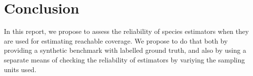 \documentclass[conference]{IEEEtran}
\begin{document}
\section{Conclusion}
\label{sec:conclusion}
In this report, we propose to assess the reliability of species estimators when
they are used for estimating reachable coverage. We propose to do that both by
providing a synthetic benchmark with labelled ground truth, and also by
using a separate means of checking the reliability of estimators by variying
the sampling units used.








\end{document}
